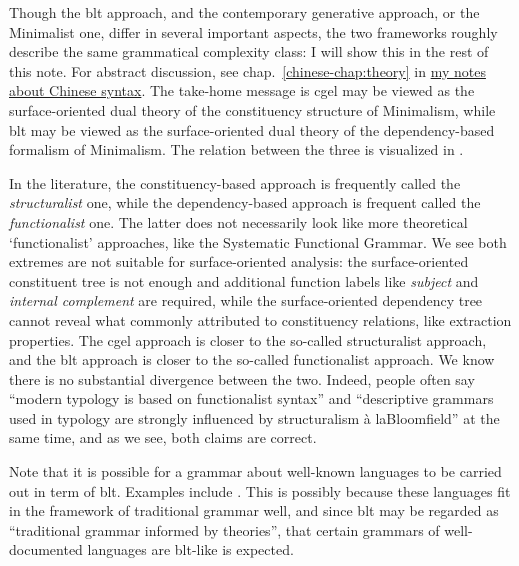 \documentclass{article}
\newcommand*{\citechap}[1]{chap.~{#1}}
\newcommand*{\term}[1]{\emph{#1}}
\newcommand{\chinese}{\href{../Chinese/main.pdf}{my notes about Chinese syntax}}
\newcommand{\ala}{à la}
\begin{document}
Though the \ac{blt} approach, and the contemporary generative approach, or the Minimalist one,
differ in several important aspects,
the two frameworks roughly describe the same grammatical complexity class:
I will show this in the rest of this note. 
For abstract discussion, see \citechap{\ref{chinese-chap:theory}} in \chinese. 
The take-home message is
\ac{cgel} may be viewed as the surface-oriented dual theory of the constituency structure of Minimalism,
while \ac{blt} may be viewed as the surface-oriented dual theory of the dependency-based formalism of Minimalism.
The relation between the three is visualized in .

In the literature, the constituency-based approach is frequently called the \emph{structuralist} one,
while the dependency-based approach is frequent called the \emph{functionalist} one.
The latter does not necessarily look like more theoretical `functionalist' approaches,
like the Systematic Functional Grammar.
We see both extremes are not suitable for surface-oriented analysis:
the surface-oriented constituent tree is not enough
and additional function labels like \term{subject} and \term{internal complement}
are required,
while the surface-oriented dependency tree 
cannot reveal what commonly attributed to constituency relations,
like extraction properties.
The \ac{cgel} approach is closer to the so-called structuralist approach,
and the \ac{blt} approach is closer to the so-called functionalist approach.
We know there is no substantial divergence between the two.
Indeed, people often say 
``modern typology is based on functionalist syntax''
and ``descriptive grammars used in typology are strongly influenced by structuralism \ala Bloomfield''
at the same time,
and as we see, both claims are correct.

Note that it is possible for a grammar about well-known languages to be carried out in term of \ac{blt}.
Examples include \cite{batchelor2010reference,batchelor2011reference}.
This is possibly because these languages fit in the framework of traditional grammar well,
and since \ac{blt} may be regarded as ``traditional grammar informed by theories'',
that certain grammars of well-documented languages are \ac{blt}-like is expected.
\end{document}
